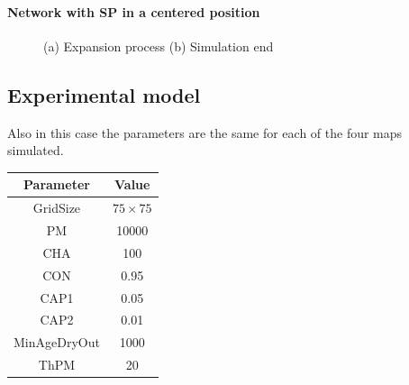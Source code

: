 \paragraph{Network with SP in a centered position}
\begin{figure}[H]
    \centering
    \caption{(a) Expansion process (b) Simulation end}
    \label{fig:foobar}
\end{figure}

\subsection{Experimental model}

Also in this case the parameters are the same for each of the four maps simulated.

\begin{center}
 \begin{tabular}{||c c||} 
 \hline
 Parameter & Value \\ [0.5ex] 
 \hline\hline
 GridSize & $75 \times 75$ \\ 
 \hline
 PM & 10000 \\ 
 \hline
 CHA & 100 \\ 
 \hline
 CON & 0.95 \\ 
 \hline
 CAP1 & 0.05 \\ 
 \hline
 CAP2 & 0.01 \\ 
 \hline
 MinAgeDryOut & 1000 \\
 \hline
 ThPM & 20 \\ [1ex] 
 \hline
 \end{tabular}
\end{center}

